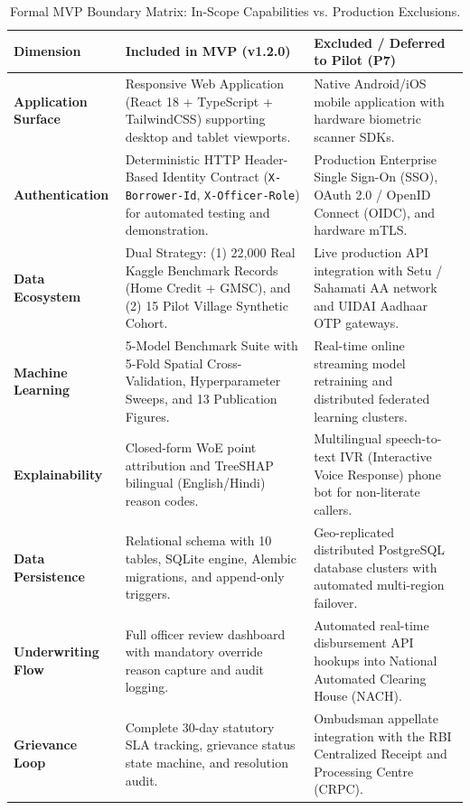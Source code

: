 \begin{table}[H]
\centering
\small
\renewcommand{\arraystretch}{1.25}
\begin{tabularx}{\textwidth}{p{3.2cm}X X}
  \toprule
  \textbf{Dimension} & \textbf{Included in MVP (v1.2.0)} & \textbf{Excluded / Deferred to Pilot (P7)} \\
  \midrule
  \textbf{Application Surface} & Responsive Web Application (React 18 + TypeScript + TailwindCSS) supporting desktop and tablet viewports. & Native Android/iOS mobile application with hardware biometric scanner SDKs. \\
  \addlinespace
  \textbf{Authentication} & Deterministic HTTP Header-Based Identity Contract (\texttt{X-Borrower-Id}, \texttt{X-Officer-Role}) for automated testing and demonstration. & Production Enterprise Single Sign-On (SSO), OAuth 2.0 / OpenID Connect (OIDC), and hardware mTLS. \\
  \addlinespace
  \textbf{Data Ecosystem} & Dual Strategy: (1) 22,000 Real Kaggle Benchmark Records (Home Credit + GMSC), and (2) 15 Pilot Village Synthetic Cohort. & Live production API integration with Setu / Sahamati AA network and UIDAI Aadhaar OTP gateways. \\
  \addlinespace
  \textbf{Machine Learning} & 5-Model Benchmark Suite with 5-Fold Spatial Cross-Validation, Hyperparameter Sweeps, and 13 Publication Figures. & Real-time online streaming model retraining and distributed federated learning clusters. \\
  \addlinespace
  \textbf{Explainability} & Closed-form WoE point attribution and TreeSHAP bilingual (English/Hindi) reason codes. & Multilingual speech-to-text IVR (Interactive Voice Response) phone bot for non-literate callers. \\
  \addlinespace
  \textbf{Data Persistence} & Relational schema with 10 tables, SQLite engine, Alembic migrations, and append-only triggers. & Geo-replicated distributed PostgreSQL database clusters with automated multi-region failover. \\
  \addlinespace
  \textbf{Underwriting Flow} & Full officer review dashboard with mandatory override reason capture and audit logging. & Automated real-time disbursement API hookups into National Automated Clearing House (NACH). \\
  \addlinespace
  \textbf{Grievance Loop} & Complete 30-day statutory SLA tracking, grievance status state machine, and resolution audit. & Ombudsman appellate integration with the RBI Centralized Receipt and Processing Centre (CRPC). \\
  \bottomrule
\end{tabularx}
\caption{Formal MVP Boundary Matrix: In-Scope Capabilities vs. Production Exclusions.}
\label{tab:scope_matrix}
\end{table}
